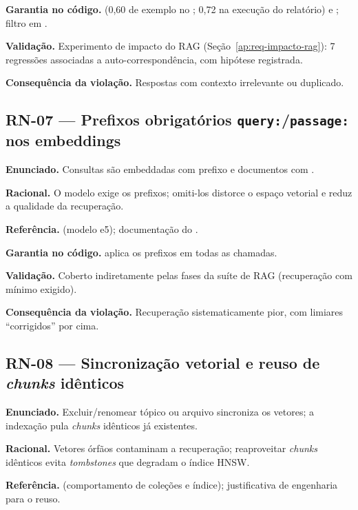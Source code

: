 \textbf{Garantia no código.} \texttt{} (0,60 de exemplo no \texttt{}; 0,72 na execução do relatório) e \texttt{}; filtro \texttt{} em .

\textbf{Validação.} Experimento de impacto do RAG (Seção~\ref{ap:req-impacto-rag}): 7 regressões associadas a auto-correspondência, com hipótese registrada.

\textbf{Consequência da violação.} Respostas com contexto irrelevante ou duplicado.

\subsection{RN-07 --- Prefixos obrigatórios \texttt{query:}/\texttt{passage:} nos embeddings}

\textbf{Enunciado.} Consultas são embeddadas com prefixo \texttt{} e documentos com \texttt{}.

\textbf{Racional.} O modelo exige os prefixos; omiti-los distorce o espaço vetorial e reduz a qualidade da recuperação.

\textbf{Referência.} \cite{reimers_gurevych_2019} (modelo e5); documentação do \texttt{}.

\textbf{Garantia no código.}  aplica os prefixos em todas as chamadas.

\textbf{Validação.} Coberto indiretamente pelas fases da suíte de RAG (recuperação com \texttt{} mínimo exigido).

\textbf{Consequência da violação.} Recuperação sistematicamente pior, com limiares ``corrigidos'' por cima.

\subsection{RN-08 --- Sincronização vetorial e reuso de \emph{chunks} idênticos}

\textbf{Enunciado.} Excluir/renomear tópico ou arquivo sincroniza os vetores; a indexação pula \emph{chunks} idênticos já existentes.

\textbf{Racional.} Vetores órfãos contaminam a recuperação; reaproveitar \emph{chunks} idênticos evita \emph{tombstones} que degradam o índice HNSW.

\textbf{Referência.} \cite{chromadb_2025} (comportamento de coleções e índice); justificativa de engenharia para o reuso.

